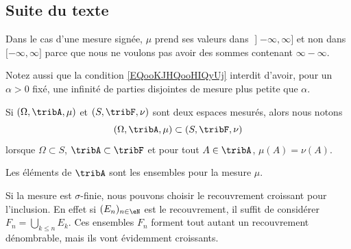 \subsection{Suite du texte}


\begin{normaltext}
	Dans le cas d'une mesure signée, \( \mu\) prend ses valeurs dans \( \mathopen] -\infty,\infty\mathclose]\) et non dans \( \mathopen[ -\infty,\infty\mathclose]\) parce que nous ne voulons pas avoir des sommes contenant \( \infty-\infty\).

	Notez aussi que la condition \eqref{EQooKJHQooHIQyUj} interdit d'avoir, pour un \( \alpha>0\) fixé, une infinité de parties disjointes de mesure plus petite que \( \alpha\).
\end{normaltext}

Si \( (\Omega,\tribA,\mu)\) et \( (S,\tribF,\nu)\) sont deux espaces mesurés, alors nous notons
\begin{equation}
	(\Omega,\tribA,\mu)\subset (S,\tribF,\nu)
\end{equation}
lorsque \( \Omega\subset S\), \( \tribA\subset\tribF\) et pour tout \( A\in\tribA\), \( \mu(A)=\nu(A)\).

\begin{definition}\label{DefHGsQxHB}
	Les éléments de \( \tribA\) sont les ensembles  pour la mesure \( \mu\).
\end{definition}

Si la mesure est \( \sigma\)-finie, nous pouvons choisir le recouvrement croissant pour l'inclusion. En effet si \( (E_n)_{n\in \eN}\) est le recouvrement, il suffit de considérer \( F_n=\bigcup_{k\leq n}E_k\). Ces ensembles \( F_n\) forment tout autant un recouvrement dénombrable, mais ils vont évidemment croissants.

